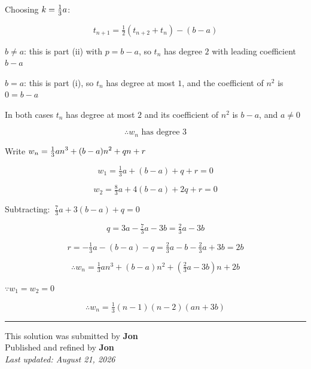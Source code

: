 \documentclass[12pt]{article}
\begin{document}
Choosing $\displaystyle k=\tfrac13a$:

$$t_{n+1}=\tfrac12\left(t_{n+2}+t_n\right)-(b-a)$$

$b\neq a$: this is part (ii) with $p=b-a$, so $t_n$ has degree $2$ with leading coefficient $b-a$

$b=a$: this is part (i), so $t_n$ has degree at most $1$, and the coefficient of $n^2$ is $0=b-a$

In both cases $t_n$ has degree at most $2$ and its coefficient of $n^2$ is $b-a$, and $a\neq0$

$$\therefore \boxed{w_n\text{ has degree }3}$$

\bigskip

Write $\displaystyle w_n=\tfrac13an^3+(b-a)n^2+qn+r$

$$w_1=\tfrac13a+(b-a)+q+r=0$$

$$w_2=\tfrac83a+4(b-a)+2q+r=0$$

Subtracting: $\ \tfrac73a+3(b-a)+q=0$

$$q=3a-\tfrac73a-3b=\tfrac23a-3b$$

$$r=-\tfrac13a-(b-a)-q=\tfrac23a-b-\tfrac23a+3b=2b$$

$$\therefore \boxed{w_n=\tfrac13an^3+(b-a)n^2+\left(\tfrac23a-3b\right)n+2b}$$

\bigskip

$\because w_1=w_2=0$

$$\therefore w_n=\tfrac13(n-1)(n-2)(an+3b)$$

\bigskip
\hrule
\begin{center}
    This solution was submitted by \textbf{Jon}\\[4pt]
    Published and refined by \textbf{Jon}\\[8pt]
    \textit{Last updated: August 21, 2026}
\end{center}
\end{document}
